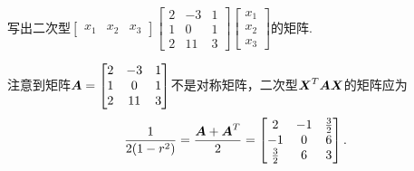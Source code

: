 \begin{example}
写出二次型\(\begin{bmatrix}
x_1 & x_2 & x_3
\end{bmatrix} \begin{bmatrix}
2 & -3 & 1 \\
1 & 0 & 1 \\
2 & 11 & 3
\end{bmatrix} \begin{bmatrix}
x_1 \\ x_2 \\ x_3
\end{bmatrix}\)的矩阵.
\begin{solution}
注意到矩阵\(\boldsymbol{A} = \begin{bmatrix}
2 & -3 & 1 \\
1 & 0 & 1 \\
2 & 11 & 3
\end{bmatrix}\)不是对称矩阵，二次型\(\boldsymbol{X}^T\boldsymbol{A}\boldsymbol{X}\)的矩阵应为\[
\frac{1}{2(1-r^2)} = \frac{\boldsymbol{A}+\boldsymbol{A}^T}{2} = \begin{bmatrix}
2 & -1 & \frac{3}{2} \\
-1 & 0 & 6 \\
\frac{3}{2} & 6 & 3
\end{bmatrix}.
\]
\end{solution}
\end{example}

